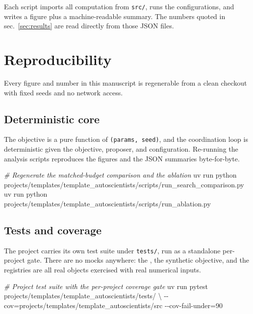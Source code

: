 \documentclass[
]{article}
\newenvironment{Shaded}{}{}
\newcommand{\AttributeTok}[1]{\textcolor[rgb]{0.49,0.56,0.16}{#1}}
\newcommand{\CommentTok}[1]{\textcolor[rgb]{0.38,0.63,0.69}{\textit{#1}}}
\newcommand{\DataTypeTok}[1]{\textcolor[rgb]{0.56,0.13,0.00}{#1}}
\newcommand{\ExtensionTok}[1]{#1}
\newcommand{\NormalTok}[1]{#1}
\newcommand{\OperatorTok}[1]{\textcolor[rgb]{0.40,0.40,0.40}{#1}}
\begin{document}
Each script imports all computation from \texttt{src/}, runs the
configurations, and writes a figure plus a machine-readable summary. The
numbers quoted in sec.~\ref{sec:results} are read directly from those
JSON files.

\newpage

\section{Reproducibility}\label{sec:reproducibility}

Every figure and number in this manuscript is regenerable from a clean
checkout with fixed seeds and no network access.

\subsection{Deterministic core}\label{deterministic-core}

The objective is a pure function of \texttt{(params,\ seed)}, and the
coordination loop is deterministic given the objective, proposer, and
configuration. Re-running the analysis scripts reproduces the figures
and the JSON summaries byte-for-byte.

\begin{Shaded}
\begin{Highlighting}[]
\CommentTok{\# Regenerate the matched{-}budget comparison and the ablation}
\ExtensionTok{uv}\NormalTok{ run python projects/templates/template\_autoscientists/scripts/run\_search\_comparison.py}
\ExtensionTok{uv}\NormalTok{ run python projects/templates/template\_autoscientists/scripts/run\_ablation.py}
\end{Highlighting}
\end{Shaded}

\subsection{Tests and coverage}\label{tests-and-coverage}

The project carries its own test suite under \texttt{tests/}, run as a
standalone per-project gate. There are no mocks anywhere: the
, the synthetic objective, and the
registries are all real objects exercised with real numerical inputs.

\begin{Shaded}
\begin{Highlighting}[]
\CommentTok{\# Project test suite with the per{-}project coverage gate}
\ExtensionTok{uv}\NormalTok{ run pytest projects/templates/template\_autoscientists/tests/ }\DataTypeTok{\textbackslash{}}
    \AttributeTok{{-}{-}cov}\OperatorTok{=}\NormalTok{projects/templates/template\_autoscientists/src }\AttributeTok{{-}{-}cov{-}fail{-}under}\OperatorTok{=}\NormalTok{90}
\end{Highlighting}
\end{Shaded}
\end{document}
